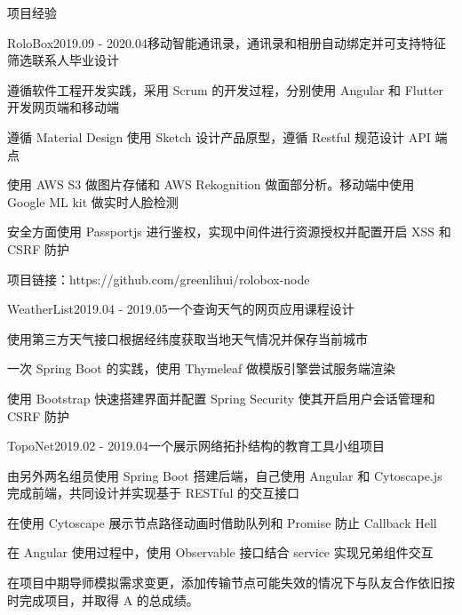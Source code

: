 \documentclass{resume} %
\begin{document}
\begin{rSection}{项目经验}

\begin{rSubsection}{RoloBox}{2019.09 - 2020.04}{移动智能通讯录，通讯录和相册自动绑定并可支持特征筛选联系人}{毕业设计}
\item 遵循软件工程开发实践，采用 Scrum 的开发过程，分别使用 Angular 和 Flutter 开发网页端和移动端
\item 遵循 Material Design 使用 Sketch 设计产品原型，遵循 Restful 规范设计 API 端点
\item 使用 AWS S3 做图片存储和 AWS Rekognition 做面部分析。移动端中使用 Google ML kit 做实时人脸检测
\item 安全方面使用 Passportjs 进行鉴权，实现中间件进行资源授权并配置开启 XSS 和 CSRF 防护
\item 项目链接：https://github.com/greenlihui/rolobox-node
\end{rSubsection}

\begin{rSubsection}{WeatherList}{2019.04 - 2019.05}{一个查询天气的网页应用}{课程设计}
\item 使用第三方天气接口根据经纬度获取当地天气情况并保存当前城市
\item 一次 Spring Boot 的实践，使用 Thymeleaf 做模版引擎尝试服务端渲染
\item 使用 Bootstrap 快速搭建界面并配置 Spring Security 使其开启用户会话管理和 CSRF 防护
\end{rSubsection}

\begin{rSubsection}{TopoNet}{2019.02 - 2019.04}{一个展示网络拓扑结构的教育工具}{小组项目}
\item 由另外两名组员使用 Spring Boot 搭建后端，自己使用 Angular 和 Cytoscape.js 完成前端，共同设计并实现基于 RESTful 的交互接口
\item 在使用 Cytoscape 展示节点路径动画时借助队列和 Promise 防止 Callback Hell
\item 在 Angular 使用过程中，使用 Observable 接口结合 service 实现兄弟组件交互
\item 在项目中期导师模拟需求变更，添加传输节点可能失效的情况下与队友合作依旧按时完成项目，并取得 A 的总成绩。
\end{rSubsection}

\end{rSection}


\end{document}
